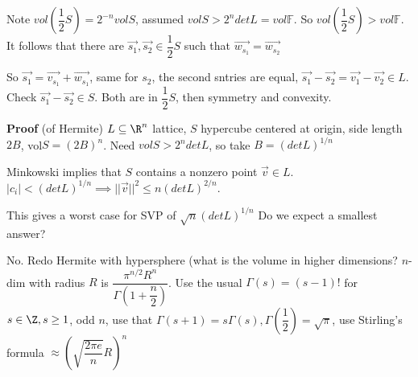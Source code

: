 \documentclass[10pt]{article}
\begin{document}
Note $vol(\dfrac{1}{2}S) = 2^{-n}vol S$, assumed $vol S > 2^n det L = vol \mathbb{F}$. So $vol(\dfrac{1}{2}S) > vol \mathbb{F}$. It follows that there are $\vec{s_1}, \vec{s_2} \in \dfrac{1}{2}S$ such that $\vec{w_{s_1}} = \vec{w_{s_2}}$

So $\vec{s_1} = \vec{v_{s_1}} + \vec{w_{s_1}}$, same for $s_2$, the second sntries are equal, $\vec{s_1} - \vec{s_2} = \vec{v_1} - \vec{v_2} \in L$. Check $\vec{s_1} - \vec{s_2} \in S$. Both are in $\dfrac{1}{2}S$, then symmetry and convexity.

\textbf{Proof} (of Hermite) $L \subseteq \R^n$ lattice, $S$ hypercube centered at origin, side length $2B$, vol$S = (2B)^n$. Need $volS > 2^n detL$, so take $B = (det L)^{1/n}$

Minkowski implies that $S$ contains a nonzero point $\vec{v} \in L$. $|c_i| < (det L)^{1/n} \implies ||\vec{v}||^2 \leq n (det L)^{2/n}$.

This gives a worst case for SVP of $\sqrt{n}(det L)^{1/n}$ Do we expect a smallest answer?

No. Redo Hermite with hypersphere (what is the volume in higher dimensions? $n$-dim with radius $R$ is $\dfrac{\pi^{n/2} R^n}{\Gamma\left(1 + \dfrac{n}{2}\right)}$. Use the usual $\Gamma(s) = (s - 1)!$ for $s\in \Z, s \geq 1$, odd $n$, use that $\Gamma(s + 1) = s\Gamma(s), \Gamma\left(\dfrac{1}{2}\right) = \sqrt{\pi}$, use Stirling's formula $\approx (\sqrt{\dfrac{2\pi e}{n}}R)^n$
\end{document}
